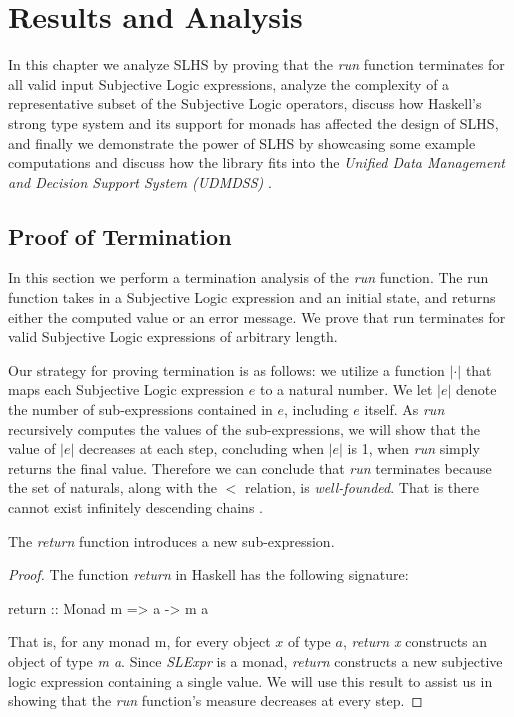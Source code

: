 \documentclass[thesis.tex]{subfiles}
\begin{document}
\chapter{Results and Analysis}
\label{chap:results-and-analysis}

In this chapter we analyze SLHS by proving that the \emph{run} function terminates for
all valid input Subjective Logic expressions, analyze the complexity of a representative subset of the Subjective Logic operators,
discuss how Haskell's strong type system and its support for monads has affected the
design of SLHS, and finally we demonstrate the power of SLHS by showcasing some
example computations and discuss how the library fits into the
\emph{Unified Data Management and Decision Support System (UDMDSS)} \cite{kent2010application, kent2010towards}.


\section{Proof of Termination}
\label{sec:termination}

In this section we perform a termination analysis of the \emph{run} function. The
run function takes in a Subjective Logic expression and an initial state, and returns
either the computed value or an error message. We prove that run terminates for valid
Subjective Logic expressions of arbitrary length.

Our strategy for proving termination is as follows: we utilize a function $|\cdot|$ that
maps each Subjective Logic expression $e$ to a natural number. We let $|e|$
denote the number of sub-expressions contained in
$e$, including $e$ itself. As \emph{run} recursively computes the values of the
sub-expressions, we will show that the value of $|e|$ decreases at each step, concluding
when $|e|$ is 1, when \emph{run} simply returns the final value. Therefore we can conclude
that \emph{run} terminates
because the set of naturals, along with the $<$ relation, is \emph{well-founded}. That is there
cannot exist infinitely descending chains \cite{moschovakis2006notes}.

\begin{lemma}
  The \emph{return} function introduces a new sub-expression.
\end{lemma}

\begin{proof}
  The function \emph{return} in Haskell has the following signature:

  \begin{spec}
    return :: Monad m => a -> m a
  \end{spec}

  That is, for any monad m, for every object $x$ of type $a$, \emph{return x} constructs
  an object of type \emph{m a}. Since \emph{SLExpr} is a monad, \emph{return} constructs
  a new subjective logic expression containing a single value. We will use this result to
  assist us in showing that the \emph{run} function's measure decreases at every step.
\end{proof}
\end{document}
